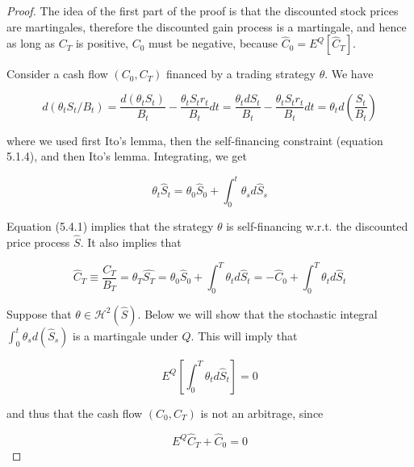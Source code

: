 \documentclass[\topdir/lecture\_notes.tex]{subfiles}
\begin{document}
\begin{proof}
The idea of the first part of the proof is that the discounted stock prices are martingales, therefore the discounted gain process is a martingale, and hence as long as \(C_{T}\) is positive, \(C_{0}\) must be negative, because \(\hat{C}_{0}=E^{Q}\left[\hat{C}_{T}\right]\).

Consider a cash flow \(\left(C_{0}, C_{T}\right)\) financed by a trading strategy \(\theta\). We have

\begin{equation*}
d\left(\theta_{t} S_{t}/B_{t}\right)=\frac{d\left(\theta_{t} S_{t}\right)}{B_{t}}-\frac{\theta_{t} S_{t} r_{t}}{B_{t}} d t=\frac{\theta_{t} d S_{t}}{B_{t}}-\frac{\theta_{t} S_{t} r_{t}}{B_{t}} d t=\theta_{t} d\left(\frac{S_{t}}{B_{t}}\right)
\end{equation*}

where we used first Ito's lemma, then the self-financing constraint (equation 5.1.4), and then Ito's lemma. Integrating, we get

\begin{equation*}
\theta_{t} \hat{S}_{t}=\theta_{0} \hat{S}_{0}+\int_{0}^{t} \theta_{s} d \hat{S}_{s}
\end{equation*}

Equation (5.4.1) implies that the strategy \(\theta\) is self-financing w.r.t. the discounted price process \(\hat{S}\). It also implies that

\begin{equation*}
\hat{C}_{T} \equiv \frac{C_{T}}{B_{T}}=\theta_{T} \hat{S_{T}}=\theta_{0} \hat{S}_{0}+\int_{0}^{T} \theta_{t} d \hat{S}_{t}=-\hat{C}_{0}+\int_{0}^{T} \theta_{t} d \hat{S}_{t}
\end{equation*}

Suppose that \(\theta \in \mathcal{H}^{2}(\hat{S})\). Below we will show that the stochastic integral \(\int_{0}^{t} \theta_{s} d\left(\hat{S}_{s}\right)\) is a martingale under \(Q\). This will imply that

\begin{equation*}
E^{Q}\left[\int_{0}^{T} \theta_{t} d \hat{S}_{t}\right]=0
\end{equation*}

and thus that the cash flow \(\left(C_{0}, C_{T}\right)\) is not an arbitrage, since

\begin{equation*}
E^{Q} \hat{C}_{T}+\hat{C}_{0}=0
\end{equation*}


\end{proof}
\end{document}
